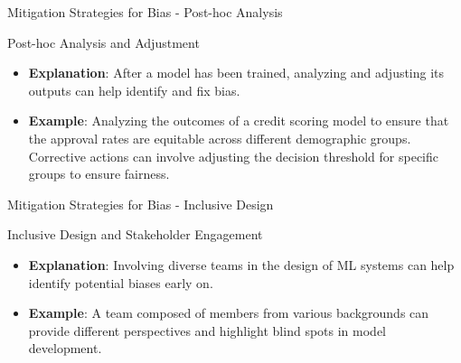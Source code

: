 \documentclass[aspectratio=169]{beamer}
\begin{document}
\begin{frame}[fragile]{Mitigation Strategies for Bias - Post-hoc Analysis}
    \begin{block}{Post-hoc Analysis and Adjustment}
        \begin{itemize}
            \item \textbf{Explanation}: After a model has been trained, analyzing and adjusting its outputs can help identify and fix bias.
            \item \textbf{Example}: Analyzing the outcomes of a credit scoring model to ensure that the approval rates are equitable across different demographic groups. Corrective actions can involve adjusting the decision threshold for specific groups to ensure fairness.
        \end{itemize}
    \end{block}
\end{frame}

\begin{frame}[fragile]{Mitigation Strategies for Bias - Inclusive Design}
    \begin{block}{Inclusive Design and Stakeholder Engagement}
        \begin{itemize}
            \item \textbf{Explanation}: Involving diverse teams in the design of ML systems can help identify potential biases early on.
            \item \textbf{Example}: A team composed of members from various backgrounds can provide different perspectives and highlight blind spots in model development.
        \end{itemize}
    \end{block}
\end{frame}
\end{document}
